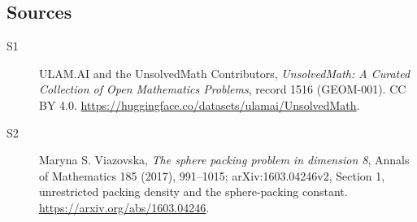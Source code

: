 \documentclass[11pt]{article}
\begin{document}
\subsection{Sources}
\begin{description}
\item[\hypertarget{source:1516:1}{S1}] ULAM.AI and the UnsolvedMath Contributors, \emph{UnsolvedMath: A Curated Collection of Open Mathematics Problems}, record 1516 (GEOM-001). CC BY 4.0. \url{https://huggingface.co/datasets/ulamai/UnsolvedMath}.
\item[\hypertarget{source:1516:2}{S2}] Maryna S. Viazovska, \emph{The sphere packing problem in dimension 8}, Annals of Mathematics 185 (2017), 991--1015; arXiv:1603.04246v2, Section 1, unrestricted packing density and the sphere-packing constant. \url{https://arxiv.org/abs/1603.04246}.
\end{description}
\label{end:1516}
\end{document}
